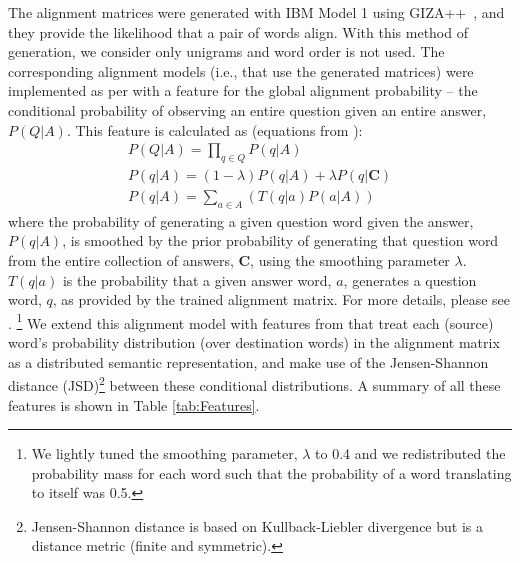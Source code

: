 {}  The alignment matrices were generated with IBM Model 1 \citep{Brown:93} using GIZA++~\citep{och03}, and they provide the likelihood that a pair of words align.  With this method of generation, we consider only unigrams and word order is not used.  The corresponding alignment models (i.e., that use the generated matrices) were implemented as per \citet{Surdeanu:11} with a feature for the global alignment probability -- the conditional probability of observing an  entire question given an entire answer, $P(Q|A)$.  This feature is calculated as (equations from \citet{Surdeanu:11}):
\begin{eqnarray}
P(Q|A)=\prod_{q \in Q} P(q|A) \\
P(q|A) = (1 - \lambda )P(q|A) + \lambda P(q|\boldsymbol{C}) \\
P(q|A) = \sum_{a \in A} (T(q|a)P(a|A)) 
\end{eqnarray}
where the probability of generating a given question word given the answer, $P(q|A)$, is smoothed by the prior probability of generating that  question word from the entire collection of answers, $\boldsymbol{C}$, using the smoothing parameter $\lambda$.  $T(q|a)$ is the probability that a given answer word, $a$, generates a question word, $q$, as provided by the trained alignment matrix.  For more details, please see \citet{Surdeanu:11}.  \footnote{We lightly tuned the smoothing parameter, $\lambda$ to 0.4 and we redistributed the probability mass for each word such that the probability of a word translating to itself was 0.5.}  
We extend this alignment model with features from \citet{fried2015higher} that treat each (source) word's probability distribution (over destination words) in the alignment matrix as a distributed semantic representation, and make use of the Jensen-Shannon distance (JSD)\footnote{Jensen-Shannon distance is based on Kullback-Liebler divergence but is a distance metric (finite and symmetric).} between these conditional distributions.  A summary of all these features is shown in Table \ref{tab:Features}.%


